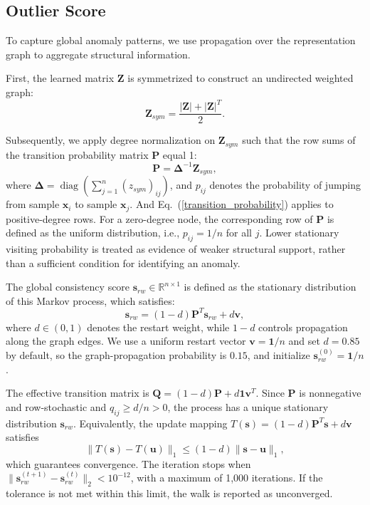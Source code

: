 \documentclass[ASNA,twocolumn]{USG} %
\begin{document}
\subsection{Outlier Score}

To capture global anomaly patterns, we use propagation over the representation graph to aggregate structural information.

First, the learned matrix $\boldsymbol{Z}$ is symmetrized to construct an undirected weighted graph:
\begin{equation}\label{eq:z_sym}
    \boldsymbol{Z}_{sym} = \frac{\boldsymbol{\left|Z\right|} + \boldsymbol{\left|Z\right|}^T}{2}.
\end{equation}

Subsequently, we apply degree normalization on $\boldsymbol{Z}_{sym}$ such that the row sums of the transition probability matrix $\boldsymbol{P}$ equal 1:
\begin{equation}\label{transition_probability}
    \boldsymbol{P} = \boldsymbol{\Delta}^{-1} \boldsymbol{Z}_{sym},
\end{equation}
where $\boldsymbol{\Delta}=\operatorname{diag}\left(\sum_{j=1}^n\left(z_{s y m}\right)_{i j}\right)$, and $p_{ij}$ denotes the probability of jumping from sample $\boldsymbol{x}_i$ to sample $\boldsymbol{x}_j$. And Eq.~(\ref{transition_probability}) applies to positive-degree rows. For a zero-degree node, the corresponding row of $\boldsymbol P$ is defined as the uniform distribution, i.e., $p_{ij}=1/n$ for all $j$. Lower stationary visiting probability is treated as evidence of weaker structural support, rather than a sufficient condition for identifying an anomaly.

The global consistency score $\boldsymbol{s}_{rw} \in \mathbb{R}^{n \times 1}$ is defined as the stationary distribution of this Markov process, which satisfies:
\begin{equation}\label{randomwalk_outlier_score}
    \boldsymbol{s}_{rw}
    = (1-d)\boldsymbol{P}^T\boldsymbol{s}_{rw}
    + d\boldsymbol{v},
\end{equation}
where $d\in(0,1)$ denotes the restart weight, while $1-d$ controls propagation along the graph edges. We use a uniform restart vector $\boldsymbol {v}=\boldsymbol{1}/n$ and set $d=0.85$ by default, so the graph-propagation probability is $0.15$, and initialize $\boldsymbol s_{rw}^{(0)}=\boldsymbol{1}/n$.

The effective transition matrix is $\boldsymbol{Q}=(1-d)\boldsymbol{P}+d\boldsymbol{1}\boldsymbol{v}^T$. Since $\boldsymbol{P}$ is nonnegative and row-stochastic and $q_{ij}\geq d/n>0$, the process has a unique stationary distribution $\boldsymbol{s}_{rw}$. Equivalently, the update mapping $T(\boldsymbol{s})=(1-d)\boldsymbol{P}^T \boldsymbol{s}+d\boldsymbol{v}$ satisfies
\begin{equation}
    \|T(\boldsymbol{s})-T(\boldsymbol{u})\|_1\leq(1-d)\|\boldsymbol{s}-\boldsymbol{u}\|_1,
\end{equation}
which guarantees convergence. The iteration stops when $\lVert \boldsymbol{s}_{rw}^{(t+1)}-\boldsymbol{s}_{rw}^{(t)}\rVert_2<10^{-12}$, with a maximum of 1,000 iterations. If the tolerance is not met within this limit, the walk is reported as unconverged.
\end{document}
